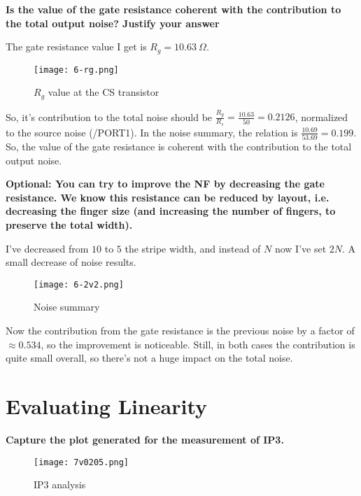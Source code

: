 
\begin{pexbox}{}
   \noindent \textbf{Is the value of the gate resistance coherent with the contribution to the total output noise? Justify your answer}
\end{pexbox}

\noindent The gate resistance value I get is $R_g = 10.63 \ \Omega$.
\begin{figure} [H] \centering
   \texttt{[image: 6-rg.png]}
   \caption{$R_g$ value at the CS transistor}
\end{figure}
\noindent So, it's contribution to the total noise should be $\frac{R_g}{R_s} = \frac{10.63}{50} = 0.2126$, normalized to the source noise (/PORT1). In the noise summary, the relation is $\frac{10.69}{53.69} = 0.199$. So, the value of the gate resistance is coherent with the contribution to the total output noise.


\begin{pexbox}{}
   \noindent \textbf{Optional: You can try to improve the NF by decreasing the gate resistance. We know this resistance can be reduced by layout, i.e. decreasing the finger size (and increasing the number of fingers, to preserve the total width).}
\end{pexbox}

\noindent I've decreased from $10$ to $5$ the stripe width, and instead of $N$ now I've set $2N$. A small decrease of noise results.
\begin{figure} [H] \centering
   \texttt{[image: 6-2v2.png]}
   \caption{Noise summary}
\end{figure}
\noindent Now the contribution from the gate resistance is the previous noise by a factor of $\approx 0.534$, so the improvement is noticeable. Still, in both cases the contribution is quite small overall, so there's not a huge impact on the total noise.





\section{Evaluating Linearity}

\begin{pexbox}{}
   \noindent \textbf{Capture the plot generated for the measurement of IP3.}
\end{pexbox}

\begin{figure} [H] \centering
   \texttt{[image: 7v0205.png]}
   \caption{IP3 analysis}
\end{figure}


